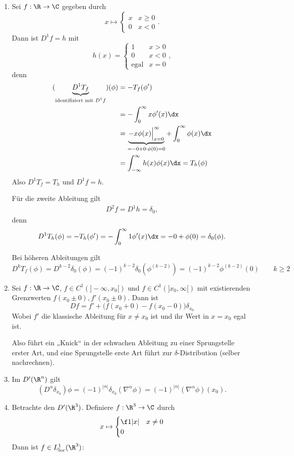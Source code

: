 \begin{ex} \label{5.15}
	\begin{enumerate}[1)]
		\item
			Sei $f : \R \to \C$ gegeben durch
			\[
				x \mapsto \begin{cases}
					x & x \ge 0 \\
					0 & x < 0
				\end{cases}.
			\]			
			Dann ist $D^1 f = h $ mit
			\[
				h(x) = \begin{cases}
					1 & x > 0 \\
					0 & x < 0 \\
					\text{egal} & x = 0
				\end{cases},
			\]
			denn
			\begin{align*}
				(\underbrace{D^1 T_f}_{\text{identifiziert mit $D^1 f$}})(\phi) 
				&= - T_f (\phi') \\
				&= - \int_0^\infty x \phi'(x) \dx \\
				&= \underbrace{- x \phi(x) \Big|_{x=0}^\infty}_{= -0 + 0 \cdot \phi(0) = 0} + \int_{0}^\infty \phi(x) \dx \\
				&= \int_{-\infty}^\infty  h(x) \phi(x) \dx
				= T_h(\phi)
			\end{align*}
			Also $D^1 T_f = T_h$ und $D^1 f = h$.

			Für die zweite Ableitung gilt
			\begin{align*}
				D^2 f = D^1 h = \delta_0,
			\end{align*}
			denn
			\begin{align*}
				D^1 T_h(\phi)
				= - T_h(\phi')
				= - \int_0^\infty 1 \phi'(x) \dx
				= - 0 + \phi(0)
				= \delta_0(\phi).
			\end{align*}

			Bei höheren Ableitungen gilt
			\[
				D^k T_f(\phi)
				= D^{k-2} \delta_0(\phi)
				= (-1)^{k-2} \delta_0(\phi^{(k-2)})
				= (-1)^{k-2} \phi^{(k-2)}(0) \qquad k \ge 2
			\]
		\item
			Sei $f : \R \to \C$, $f \in C^1(]-\infty, x_0[)$ und $f \in C^1(]x_0,\infty[)$ mit existierenden Grenzwerten $f(x_0\pm 0), f'(x_0 \pm 0)$.
			Dann ist
			\[
				Df = f' + \big(f(x_0+0) - f(x_0-0)\big) \delta_{x_0}
			\]
			Wobei $f'$ die klassische Ableitung für $x \neq x_0$ ist und ihr Wert in $x = x_0$ egal ist.

			Also führt ein „Knick“ in der schwachen Ableitung zu einer Sprungstelle erster Art, und eine Sprungstelle erste Art führt zur $\delta$-Distribution (selber nachrechnen).
		\item
			Im $D'(\R^n)$ gilt
			\[
				(D^\alpha \delta_{x_0}) \phi
				= (-1)^{|\alpha|} \delta_{x_0} (\nabla^\alpha \phi)
				= (-1)^{|\alpha|} (\nabla^\alpha \phi) (x_0).
			\]
		\item
			Betrachte den $D'(\R^3)$.
			Definiere $f : \R^3 \to \C$ durch
			\[
				x \mapsto \begin{cases}
					\f 1{|x|} & x \neq 0 \\
					0
				\end{cases}
			\]
			Dann ist $f \in L_\text{loc}^1(\R^3)$:


\end{enumerate}
\end{ex}

